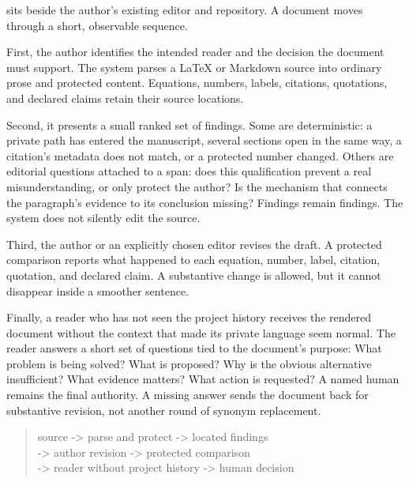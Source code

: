 \hv{} sits beside the author's existing editor and repository. A document
moves through a short, observable sequence.

First, the author identifies the intended reader and the decision the document
must support. The system parses a LaTeX or Markdown source into ordinary prose
and protected content. Equations, numbers, labels, citations, quotations, and
declared claims retain their source locations.

Second, it presents a small ranked set of findings. Some are deterministic: a
private path has entered the manuscript, several sections open in the same
way, a citation's metadata does not match, or a protected number changed.
Others are editorial questions attached to a span: does this qualification
prevent a real misunderstanding, or only protect the author? Is the mechanism
that connects the paragraph's evidence to its conclusion missing? Findings
remain findings. The system does not silently edit the source.

Third, the author or an explicitly chosen editor revises the draft. A
protected comparison reports what happened to each equation, number, label,
citation, quotation, and declared claim. A substantive change is allowed, but
it cannot disappear inside a smoother sentence.

Finally, a reader who has not seen the project history receives the rendered
document without the context that made its private language seem normal. The reader
answers a short set of questions tied to the document's purpose: What problem
is being solved? What is proposed? Why is the obvious alternative
insufficient? What evidence matters? What action is requested? A named human
remains the final authority. A missing answer sends the document back for
substantive revision, not another round of synonym replacement.

\begin{quote}\small\ttfamily
source -> parse and protect -> located findings\\
-> author revision -> protected comparison\\
-> reader without project history -> human decision
\end{quote}

